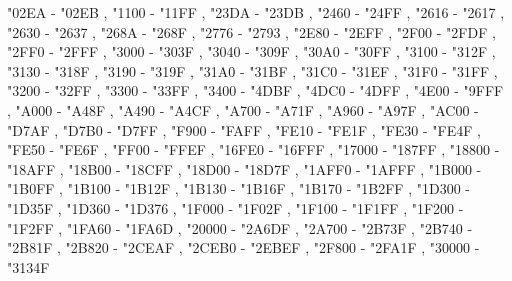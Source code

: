   {
    "02EA - "02EB ,
    "1100 - "11FF ,
    "23DA - "23DB ,
    "2460 - "24FF ,
    "2616 - "2617 ,
    "2630 - "2637 ,
    "268A - "268F ,
    "2776 - "2793 ,
    "2E80 - "2EFF ,
    "2F00 - "2FDF ,
    "2FF0 - "2FFF ,
    "3000 - "303F ,
    "3040 - "309F ,
    "30A0 - "30FF ,
    "3100 - "312F ,
    "3130 - "318F ,
    "3190 - "319F ,
    "31A0 - "31BF ,
    "31C0 - "31EF ,
    "31F0 - "31FF ,
    "3200 - "32FF ,
    "3300 - "33FF ,
    "3400 - "4DBF ,
    "4DC0 - "4DFF ,
    "4E00 - "9FFF ,
    "A000 - "A48F ,
    "A490 - "A4CF ,
    "A700 - "A71F ,
    "A960 - "A97F ,
    "AC00 - "D7AF ,
    "D7B0 - "D7FF ,
    "F900 - "FAFF ,
    "FE10 - "FE1F ,
    "FE30 - "FE4F ,
    "FE50 - "FE6F ,
    "FF00 - "FFEF ,
    "16FE0 - "16FFF ,
    "17000 - "187FF ,
    "18800 - "18AFF ,
    "18B00 - "18CFF ,
    "18D00 - "18D7F ,
    "1AFF0 - "1AFFF ,
    "1B000 - "1B0FF ,
    "1B100 - "1B12F ,
    "1B130 - "1B16F ,
    "1B170 - "1B2FF ,
    "1D300 - "1D35F ,
    "1D360 - "1D376 ,
    "1F000 - "1F02F ,
    "1F100 - "1F1FF ,
    "1F200 - "1F2FF ,
    "1FA60 - "1FA6D ,
    "20000 - "2A6DF ,
    "2A700 - "2B73F ,
    "2B740 - "2B81F ,
    "2B820 - "2CEAF ,
    "2CEB0 - "2EBEF ,
    "2F800 - "2FA1F ,
    "30000 - "3134F
  }

